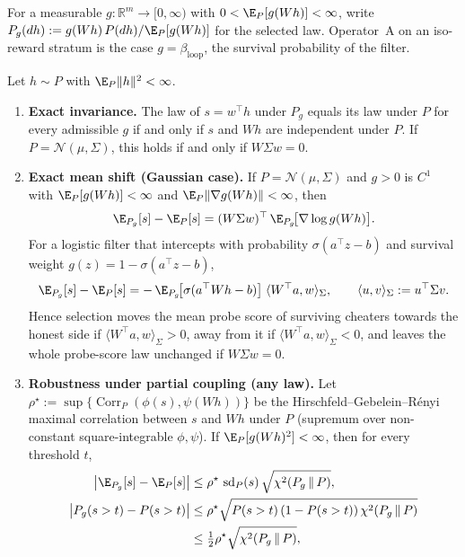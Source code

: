 For a measurable $g : \mathbb{R}^m \to [0, \infty)$ with $0 < \E_P[g(Wh)] < \infty$, write $P_g(dh) := g(Wh)\, P(dh) / \E_P[g(Wh)]$ for the selected law. Operator~A on an iso-reward stratum is the case $g = \beta_{\mathrm{loop}}$, the survival probability of the filter.

\begin{theorem}\label{thm:geometry-selection}
Let $h \sim P$ with $\E_P\|h\|^2 < \infty$.
\begin{enumerate}
  \item \textbf{Exact invariance.} The law of $s = w^\top h$ under $P_g$ equals its law under $P$ for every admissible $g$ if and only if $s$ and $Wh$ are independent under $P$. If $P = \mathcal{N}(\mu, \Sigma)$, this holds if and only if $W \Sigma w = 0$.
  \item \textbf{Exact mean shift (Gaussian case).} If $P = \mathcal{N}(\mu, \Sigma)$ and $g > 0$ is $C^1$ with $\E_P[g(Wh)] < \infty$ and $\E_P\|\nabla g(Wh)\| < \infty$, then
  \begin{equation}\label{eq:stein-shift}
    \E_{P_g}[s] - \E_P[s] = (W \Sigma w)^\top\, \E_{P_g}\!\big[\nabla \log g(Wh)\big].
  \end{equation}
  For a logistic filter that intercepts with probability $\sigma(a^\top z - b)$ and survival weight $g(z) = 1 - \sigma(a^\top z - b)$,
  \begin{equation}\label{eq:logistic-shift}
    \E_{P_g}[s] - \E_P[s] = -\,\E_{P_g}\!\big[\sigma(a^\top W h - b)\big]\; \langle W^\top a, w \rangle_{\Sigma},
    \qquad \langle u, v \rangle_\Sigma := u^\top \Sigma v.
  \end{equation}
  Hence selection moves the mean probe score of surviving cheaters towards the honest side if $\langle W^\top a, w\rangle_\Sigma > 0$, away from it if $\langle W^\top a, w\rangle_\Sigma < 0$, and leaves the whole probe-score law unchanged if $W\Sigma w = 0$.
  \item \textbf{Robustness under partial coupling (any law).} Let $\rho^\star := \sup\{\operatorname{Corr}_P(\phi(s), \psi(Wh))\}$ be the Hirschfeld--Gebelein--R\'enyi maximal correlation between $s$ and $Wh$ under $P$ (supremum over non-constant square-integrable $\phi, \psi$). If $\E_P[g(Wh)^2] < \infty$, then for every threshold $t$,
  \begin{align}
    \big|\E_{P_g}[s] - \E_P[s]\big| &\le \rho^\star\, \operatorname{sd}_P(s)\, \sqrt{\chi^2(P_g \,\|\, P)}, \label{eq:robust-mean}\\
    \big|P_g(s > t) - P(s > t)\big| &\le \rho^\star \sqrt{P(s>t)\,(1 - P(s>t))\, \chi^2(P_g \,\|\, P)} \notag\\ &\le \tfrac12 \rho^\star \sqrt{\chi^2(P_g \,\|\, P)}, \label{eq:robust-tpr}

\end{align}
\end{enumerate}
\end{theorem}
